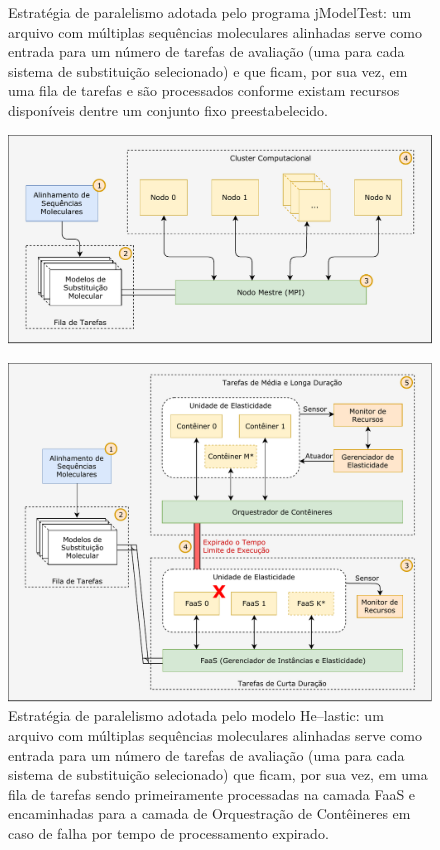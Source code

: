 \documentclass[english,brazilian]{UNISINOSmonografia} %
\begin{document}
\begin{figure}[p]
\centering%
\begin{minipage}{.75\textwidth}
	\caption{Estratégia de paralelismo adotada pelo programa jModelTest: um arquivo com múltiplas sequências moleculares alinhadas serve como entrada para um número de tarefas de avaliação (uma para cada sistema de substituição selecionado) e que ficam, por sua vez, em uma fila de tarefas e são processados conforme existam recursos disponíveis dentre um conjunto fixo preestabelecido.}
	\label{fig:modelo-jmodeltest}
	\vspace{1ex}
	\includegraphics[width=\textwidth]{modelo-jmodeltest}
\end{minipage}
\begin{minipage}{.75\textwidth}
	\caption{Estratégia de paralelismo adotada pelo modelo \textsf{He}--lastic: um arquivo com múltiplas sequências moleculares alinhadas serve como entrada para um número de tarefas de avaliação (uma para cada sistema de substituição selecionado) que ficam, por sua vez, em uma fila de tarefas sendo primeiramente processadas na camada FaaS e encaminhadas para a camada de Orquestração de Contêineres em caso de falha por tempo de processamento expirado.}
	\label{fig:modelo-strategies}
	\vspace{1ex}
	\includegraphics[width=\textwidth]{modelo-strategies}
\end{minipage}
\end{figure}
\end{document}
